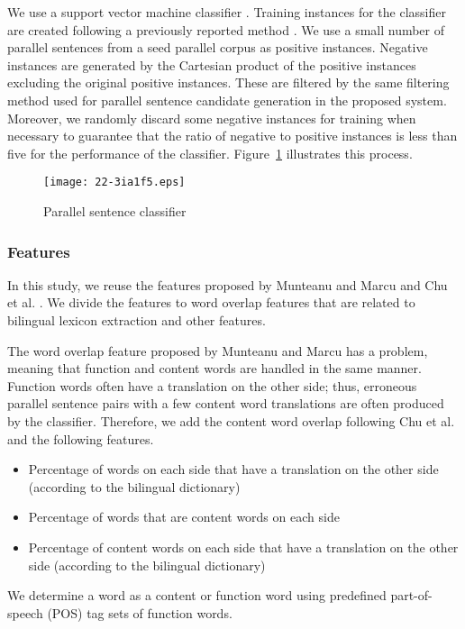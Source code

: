 \documentclass[english]{jnlp_1.4}
\begin{document}
We use a support vector machine classifier \cite{CC01a}. Training
instances for the classifier are created following a previously reported method
\cite{Munteanu:2005}. We use a small number of parallel
sentences from a seed parallel corpus as positive instances.
Negative instances are generated by the Cartesian product of the 
positive instances excluding the original positive instances. These
are filtered by the same filtering method used for parallel sentence candidate
generation in the proposed system.
Moreover, we randomly discard some negative instances for training when
necessary to guarantee that the ratio
of negative to positive instances is less than five for the performance
of the classifier. Figure~\ref{sentence_fig:classifier} illustrates this process.

\begin{figure}[b]
\begin{center}
\texttt{[image: 22-3ia1f5.eps]}
\end{center}
\caption{Parallel sentence classifier}
\label{sentence_fig:classifier}
\end{figure}


\subsubsection{Features}
\label{sentence_sec:features}

In this study, we reuse the features proposed by Munteanu and Marcu \citeyear{Munteanu:2005}
and Chu et al. \citeyear{chu:2014:LREC}. We divide the features to word overlap features 
that are related to bilingual lexicon extraction and other features.

 The word overlap feature proposed 
by Munteanu and Marcu \citeyear{Munteanu:2005} has a problem, meaning that function and content
words are handled in the same manner. Function words often have a
translation on the other side; thus, erroneous parallel sentence pairs
with a few content word translations are often produced by the classifier.
Therefore, we add the content word overlap following Chu et al. \citeyear{chu:2014:LREC}
and the following features.
\begin{itemize}
\item Percentage of words on each side that have a
      translation on the other side (according to the bilingual
      dictionary)
\item Percentage of words that are content words on each side
\item Percentage of content words on each side that have a translation
      on the other side (according to the bilingual dictionary)
\end{itemize}
We determine a word as a content or function word using predefined
part-of-speech (POS) tag sets of function words.
\end{document}
